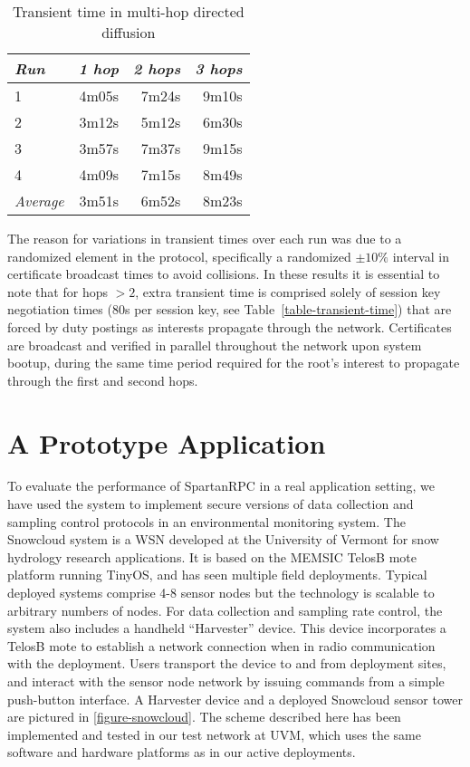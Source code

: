 \begin{table}[tbhp]
  \newcommand\T{\rule{0pt}{2.1ex}}
  \centering
  \caption{Transient time in multi-hop directed diffusion}
  {
  \begin{tabular}{|l|r|r|r|} \hline
    \textit{Run} \T & \textit{1 hop }
                    & \textit{2 hops}
                    & \textit{3 hops} \\ \hline \hline

                   1 \T &  4m05s & 7m24s & 9m10s \\ \hline
                   2 \T &  3m12s & 5m12s & 6m30s \\ \hline
                   3 \T &  3m57s & 7m37s & 9m15s \\ \hline
                   4 \T &  4m09s & 7m15s & 8m49s \\ \hline
    \textit{Average} \T &  3m51s & 6m52s & 8m23s \\ \hline
  \end{tabular}
  }
  \label{table-multi-hop-transient}
\end{table}
The reason for variations in transient times over each run was due to
a randomized element in the protocol, specifically a randomized $\pm
10\%$ interval in certificate broadcast times to avoid collisions. In
these results it is essential to note that for hops $> 2$, extra
transient time is comprised solely of session key negotiation times
(80s per session key, see Table~\ref{table-transient-time}) that are
forced by duty postings as interests propagate through the
network. Certificates are broadcast and verified in parallel
throughout the network upon system bootup, during the same time period
required for the root's interest to propagate through the first and
second hops.


\section{A Prototype Application}
\label{section-snowcloud}

To evaluate the performance of SpartanRPC in a real application
setting, we have used the system to implement secure versions of data
collection and sampling control protocols in an environmental
monitoring system. The Snowcloud system
\cite{frolik-skalka-snowcloudtr,moeser-walker-skalka-frolik-wsc11} is
a WSN developed at the University of Vermont for snow hydrology
research applications.  It is based on the MEMSIC TelosB mote platform
running TinyOS, and has seen multiple field deployments. Typical
deployed systems comprise 4-8 sensor nodes but the technology is
scalable to arbitrary numbers of nodes. For data collection and
sampling rate control, the system also includes a handheld
``Harvester'' device.  This device incorporates a TelosB mote to
establish a network connection when in radio communication with the
deployment.  Users transport the device to and from deployment sites,
and interact with the sensor node network by issuing commands from a
simple push-button interface. A Harvester device and a deployed
Snowcloud sensor tower are pictured in \autoref{figure-snowcloud}. The
scheme described here has been implemented and tested in our test
network at UVM, which uses the same software and hardware platforms as
in our active deployments.


